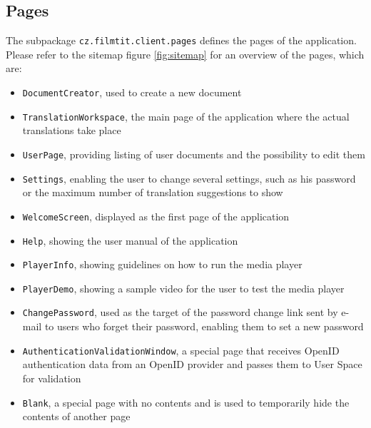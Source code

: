\subsection{Pages}

The subpackage {\tt cz.filmtit.client.pages} defines the pages of the application.
Please refer to the sitemap figure \ref{fig:sitemap} for an overview of the pages, which are:

\begin{itemize}
\item {\tt DocumentCreator}, used to create a new document
\item {\tt TranslationWorkspace}, the main page of the application where the actual translations take place
\item {\tt UserPage}, providing listing of user documents and the possibility to edit them
\item {\tt Settings}, enabling the user to change several settings, such as his password or the maximum number of translation suggestions to show
\item {\tt WelcomeScreen}, displayed as the first page of the application
\item {\tt Help}, showing the user manual of the application
\item {\tt PlayerInfo}, showing guidelines on how to run the media player
\item {\tt PlayerDemo}, showing a sample video for the user to test the media player
\item {\tt ChangePassword}, used as the target of the password change link sent by e-mail to users who forget their password, enabling them to set a new password
\item {\tt AuthenticationValidationWindow}, a special page that receives OpenID authentication data from an OpenID provider and passes them to User Space for validation
\item {\tt Blank}, a special page with no contents and is used to temporarily hide the contents of another page
\end{itemize}

